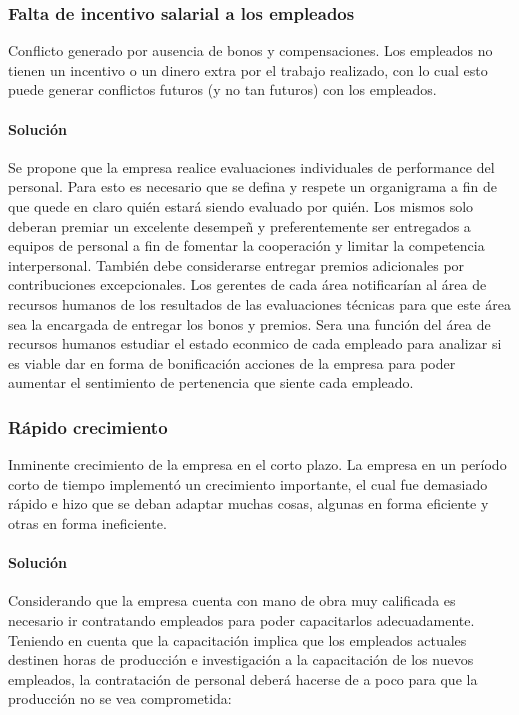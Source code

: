 \documentclass[12pt,a4paper,spanish]{article}
\begin{document}
		\subsubsection{Falta de incentivo salarial a los empleados}
			Conflicto generado por ausencia de bonos y compensaciones. Los empleados no tienen un incentivo o un dinero extra por el trabajo realizado, con lo cual esto puede generar conflictos futuros (y no tan futuros) con los empleados.
		\paragraph{Soluci\'on}
			Se propone que la empresa realice evaluaciones individuales de performance del personal. 
			Para esto es necesario que se defina y respete un organigrama a fin de que quede en claro qui\'{e}n estar\'{a} siendo evaluado por qui\'{e}n. 
			Los mismos solo deberan premiar un excelente desempe\~{n} y preferentemente ser entregados a equipos de personal a fin de fomentar la cooperaci\'{o}n y limitar la competencia interpersonal. 
			Tambi\'{e}n debe considerarse entregar premios adicionales por contribuciones excepcionales.
			Los gerentes de cada \'{a}rea notificar\'{i}an al \'{a}rea de recursos humanos de los resultados de las evaluaciones t\'{e}cnicas para que este \'{a}rea sea la encargada de entregar los bonos y premios.
			Sera una funci\'{o}n del \'{a}rea de recursos humanos estudiar el estado econmico de cada empleado para analizar si es viable dar en forma de bonificaci\'{o}n acciones de la empresa para poder aumentar el sentimiento de pertenencia que siente cada empleado.


		\subsubsection{R\'apido crecimiento}
			Inminente crecimiento de la empresa en el corto plazo. La empresa en un per\'iodo corto de tiempo implement\'o un crecimiento importante, el 				cual fue demasiado r\'apido e hizo que se deban adaptar muchas cosas, algunas en forma eficiente y otras en forma ineficiente.
		\paragraph{Soluci\'on}
			Considerando que la empresa cuenta con mano de obra muy calificada es necesario ir contratando empleados para poder capacitarlos adecuadamente. 
			Teniendo en cuenta que la capacitaci\'{o}n implica que los empleados actuales destinen horas de producci\'{o}n e investigaci\'{o}n a la capacitaci\'{o}n de los nuevos empleados, la contrataci\'{o}n de personal deber\'{a} hacerse de a poco para que la producci\'{o}n no se vea comprometida:
		
			
\end{document}
